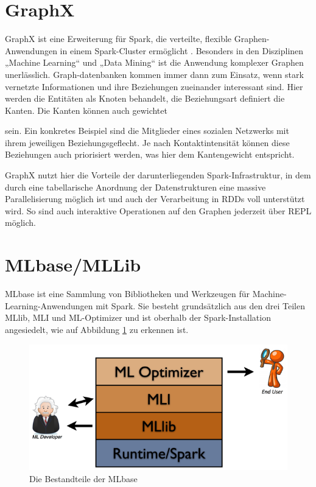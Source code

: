 \section{GraphX}
\label{section:graphX}


GraphX ist eine Erweiterung für Spark, die verteilte, flexible Graphen-Anwendungen in einem Spark-Cluster ermöglicht . Besonders in den Disziplinen „Machine Learning“ und „Data Mining“ ist die Anwendung komplexer Graphen unerlässlich. Graph-datenbanken kommen immer dann zum Einsatz, wenn stark vernetzte Informationen und ihre Beziehungen zueinander interessant sind. Hier werden die Entitäten als Knoten behandelt, die Beziehungsart definiert die Kanten. Die Kanten können auch gewichtet 

sein. Ein konkretes Beispiel sind die Mitglieder eines sozialen Netzwerks mit ihrem jeweiligen Beziehungsgeflecht. Je nach Kontaktintensität können diese Beziehungen auch priorisiert werden, was hier dem Kantengewicht entspricht.

GraphX nutzt hier die Vorteile der darunterliegenden Spark-Infrastruktur, in dem durch eine tabellarische Anordnung der Datenstrukturen eine massive Parallelisierung möglich ist und auch der Verarbeitung in RDDs voll unterstützt wird. So sind auch interaktive Operationen auf den Graphen jederzeit über REPL möglich. 

\section{MLbase/MLLib}
\label{section:mLbase/MLLib}


MLbase ist eine Sammlung von Bibliotheken und Werkzeugen für Machine-Learning-Anwendungen mit Spark. Sie besteht grundsätzlich aus den drei Teilen MLlib, MLI und ML-Optimizer und ist oberhalb der Spark-Installation angesiedelt, wie auf Abbildung \ref{fig:mlbase} zu erkennen ist. 

\begin{figure}[htb!]
\centering
\includegraphics[width=1.0\textwidth]{bilder/2_4_3_mlbase.png}
\caption{Die Bestandteile der MLbase \protect{}}
\label{fig:mlbase}
\end{figure} 
 


